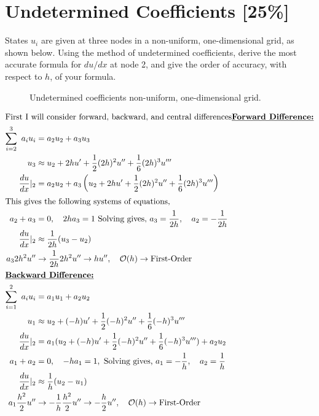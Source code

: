 \section{Undetermined Coefficients [25\%]}
States $u_i$ are given at three nodes in a non-uniform, one-dimensional grid, as shown below.  Using the method of undetermined coefficients, derive the most accurate formula for $du/dx$ at node 2, and give the order of accuracy, with respect to $h$, of your formula.


\begin{figure}[h]
    \centering
    
    \caption{Undetermined coefficients non-uniform, one-dimensional grid.}
\end{figure}


\vspace{-0.5in}
\begin{align*}
    \shortintertext{First I will consider forward, backward, and central differences\newline \textbf{\underline{Forward Difference:}}}
    \sum_{i=2}^{3}\ a_i u_i & = a_2u_2 + a_3u_3\\
    u_3 & \approx u_2 + 2hu' + \frac{1}{2}(2h)^2u'' + \frac{1}{6}(2h)^3u'''\\
    \frac{du}{dx}|_{2} & = a_2u_2 + a_3 \left( u_2 + 2hu' + \frac{1}{2}(2h)^2u'' + \frac{1}{6}(2h)^3u'''\right)\\
    \shortintertext{This gives the following systems of equations,}
    a_2 + a_3 & = 0,\quad 2ha_3  = 1\ \text{Solving gives,}\ a_3 = \frac{1}{2h}, \quad a_2 = -\frac{1}{2h}\\
    \frac{du}{dx}|_{2} & \approx \frac{1}{2h}(u_3 - u_2)\\
    a_3 2h^2u'' & \rightarrow \frac{1}{2h}2h^2u'' \rightarrow hu'',\quad \mathcal{O}(h) \rightarrow \text{First-Order}\\
    \shortintertext{\textbf{\underline{Backward Difference:}}}
    \sum_{i=1}^{2}\ a_i u_i & = a_1u_1 + a_2u_2\\
    u_1 & \approx u_2 + (-h)u' + \frac{1}{2}(-h)^2u'' + \frac{1}{6}(-h)^3u'''\\
    \frac{du}{dx}|_{2} & = a_1(u_2 + (-h)u' + \frac{1}{2}(-h)^2u'' + \frac{1}{6}(-h)^3u''') + a_2u_2\\
    a_1 + a_2 & = 0, \quad -ha_1  = 1,\ \text{Solving gives,}\ a_1 = -\frac{1}{h}, \quad a_2 = \frac{1}{h}\\
    \frac{du}{dx}|_{2} & \approx \frac{1}{h}(u_2 - u_1)\\
    a_1\frac{h^2}{2}u'' & \rightarrow -\frac{1}{h}\frac{h^2}{2}u'' \rightarrow -\frac{h}{2}u'', \quad \mathcal{O}(h) \rightarrow \text{First-Order}
\end{align*}


